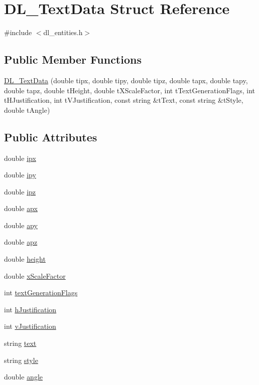\hypertarget{structDL__TextData}{\section{D\-L\-\_\-\-Text\-Data Struct Reference}
\label{structDL__TextData}
}


{\ttfamily \#include $<$dl\-\_\-entities.\-h$>$}

\subsection*{Public Member Functions}
\begin{DoxyCompactItemize}
\item 
\hyperlink{structDL__TextData_aa31deb6693a5b37de893b43c091bd30c}{D\-L\-\_\-\-Text\-Data} (double tipx, double tipy, double tipz, double tapx, double tapy, double tapz, double t\-Height, double t\-X\-Scale\-Factor, int t\-Text\-Generation\-Flags, int t\-H\-Justification, int t\-V\-Justification, const string \&t\-Text, const string \&t\-Style, double t\-Angle)
\end{DoxyCompactItemize}
\subsection*{Public Attributes}
\begin{DoxyCompactItemize}
\item 
double \hyperlink{structDL__TextData_ae6ff4ccf2c0ec4d136b562ce8d5e4b6c}{ipx}
\item 
double \hyperlink{structDL__TextData_a6ea696600ce46b2c70ff8dc23dcddbb7}{ipy}
\item 
double \hyperlink{structDL__TextData_a220516261158506c811d27b41bb0c22f}{ipz}
\item 
double \hyperlink{structDL__TextData_a5890898e18ac055d368125aeda0cef87}{apx}
\item 
double \hyperlink{structDL__TextData_a37f3b9363f4ae438b79e4db2ffab6c99}{apy}
\item 
double \hyperlink{structDL__TextData_a552719cafe56851862bfcbfedbcc478e}{apz}
\item 
double \hyperlink{structDL__TextData_acb99be867dd22ca2f31ced7f4ff23ce3}{height}
\item 
double \hyperlink{structDL__TextData_a322e0cc0909794e957cd83811b629046}{x\-Scale\-Factor}
\item 
int \hyperlink{structDL__TextData_af29798957eca4fcdaa57038b7c86d255}{text\-Generation\-Flags}
\item 
int \hyperlink{structDL__TextData_a9c6bfbf0d57c1b5d33714236ea6ffa56}{h\-Justification}
\item 
int \hyperlink{structDL__TextData_a89f9827673fc4f735a47527d168ecb96}{v\-Justification}
\item 
string \hyperlink{structDL__TextData_a63a8f86f035fd8bd2471a24db80fd643}{text}
\item 
string \hyperlink{structDL__TextData_a205e68e10b0bc16f693b4a35cc6d2df0}{style}
\item 
double \hyperlink{structDL__TextData_aa7c12bd998270c2310c8a79ccd5a74db}{angle}
\end{DoxyCompactItemize}


